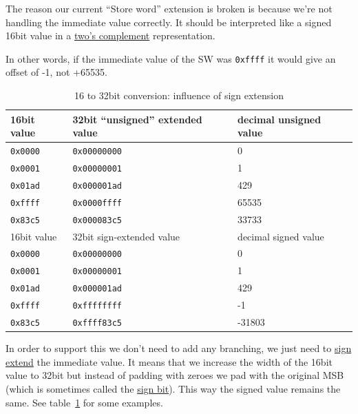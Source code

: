 \documentclass[a4paper]{article}
\newcommand{\code}[1] {\texttt{#1}}
\begin{document}
The reason our current ``Store word'' extension is broken is because
we're not handling the immediate value correctly. It should be
interpreted like a signed 16bit value in a
\href{https://en.wikipedia.org/wiki/Two%27s_complement}{two's complement}
representation.

In other words, if the immediate value of the SW was \code{0xffff}
it would give an offset of -1, not +65535.

\begin{table}[ht]
  \centering

  \begin{tabular}{ l | l | l }
    16bit value & 32bit ``unsigned'' extended value & decimal unsigned value \\
    \hline
    \code{0x0000} & \code{0x00000000} & 0     \\
    \code{0x0001} & \code{0x00000001} & 1     \\
    \code{0x01ad} & \code{0x000001ad} & 429   \\
    \code{0xffff} & \code{0x0000ffff} & 65535 \\
    \code{0x83c5} & \code{0x000083c5} & 33733 \\
    \hline
    \hline
    16bit value & 32bit sign-extended value & decimal signed value \\
    \hline
    \code{0x0000} & \code{0x00000000} & 0      \\
    \code{0x0001} & \code{0x00000001} & 1      \\
    \code{0x01ad} & \code{0x000001ad} & 429    \\
    \code{0xffff} & \code{0xffffffff} & -1     \\
    \code{0x83c5} & \code{0xffff83c5} & -31803 \\
  \end{tabular}

  \caption{16 to 32bit conversion: influence of sign extension}
  \label{tab:signextend}
\end{table}

In order to support this we don't need to add any branching, we just
need to \href{https://en.wikipedia.org/wiki/Sign_extension}{sign
  extend} the immediate value. It means that we increase the width of
the 16bit value to 32bit but instead of padding with zeroes we pad
with the original MSB (which is sometimes called the
\href{https://en.wikipedia.org/wiki/Sign_bit}{sign bit}). This way the
signed value remains the same. See table~\ref{tab:signextend} for some
examples.
\end{document}
